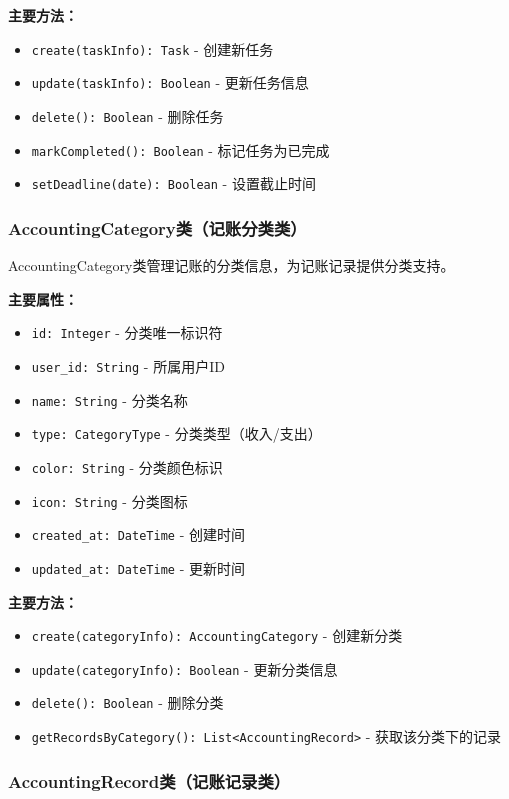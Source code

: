 \documentclass[a4paper]{article}
\begin{document}
\textbf{主要方法：}
\begin{itemize}
    \item \texttt{create(taskInfo): Task} - 创建新任务
    \item \texttt{update(taskInfo): Boolean} - 更新任务信息
    \item \texttt{delete(): Boolean} - 删除任务
    \item \texttt{markCompleted(): Boolean} - 标记任务为已完成
    \item \texttt{setDeadline(date): Boolean} - 设置截止时间
\end{itemize}

\subsubsection{AccountingCategory类（记账分类类）}

AccountingCategory类管理记账的分类信息，为记账记录提供分类支持。

\textbf{主要属性：}
\begin{itemize}
    \item \texttt{id: Integer} - 分类唯一标识符
    \item \texttt{user\_id: String} - 所属用户ID
    \item \texttt{name: String} - 分类名称
    \item \texttt{type: CategoryType} - 分类类型（收入/支出）
    \item \texttt{color: String} - 分类颜色标识
    \item \texttt{icon: String} - 分类图标
    \item \texttt{created\_at: DateTime} - 创建时间
    \item \texttt{updated\_at: DateTime} - 更新时间
\end{itemize}

\textbf{主要方法：}
\begin{itemize}
    \item \texttt{create(categoryInfo): AccountingCategory} - 创建新分类
    \item \texttt{update(categoryInfo): Boolean} - 更新分类信息
    \item \texttt{delete(): Boolean} - 删除分类
    \item \texttt{getRecordsByCategory(): List<AccountingRecord>} - 获取该分类下的记录
\end{itemize}

\subsubsection{AccountingRecord类（记账记录类）}
\end{document}
